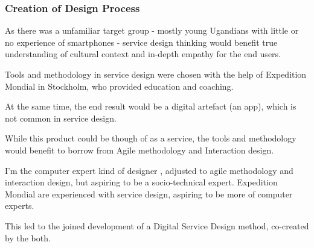 


\subsubsection{Creation of Design Process}
As there was a unfamiliar target group - mostly young Ugandians with little or no experience of smartphones - service design thinking would benefit true understanding of cultural context and in-depth empathy for the end users.

Tools and methodology in service design were chosen with the help of Expedition Mondial in Stockholm, who provided education and coaching.

At the same time, the end result would be a digital artefact (an app), which is not common in service design.

While this product could be though of as a service, the tools and methodology would benefit to borrow from Agile methodology and Interaction design.

I'm the computer expert kind of designer \cite{lowgren}, adjusted to agile methodology and interaction design, but aspiring to be a socio-technical expert. Expedition Mondial are experienced with service design, aspiring to be more of computer experts.

This led to the joined development of a Digital Service Design method, co-created by the both.



